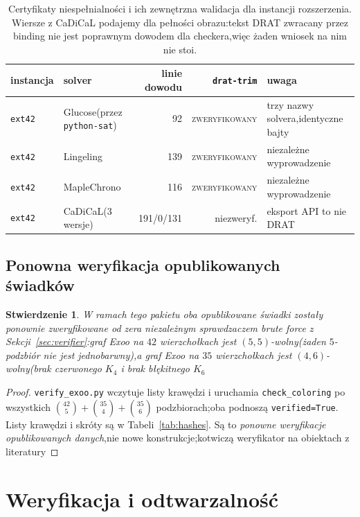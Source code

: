 \documentclass[11pt]{article}
\newtheorem{proposition}[theorem]{Stwierdzenie}
\theoremstyle{definition}
\theoremstyle{plain}
\newcommand{\K}{\ensuremath{K}}
\begin{document}
\begin{table}[ht]\centering\small
\begin{tabular}{llrrl}
\toprule
instancja & solver & linie dowodu & \texttt{drat-trim} & uwaga \\
\midrule
\texttt{ext42} & Glucose(przez \texttt{python-sat})& 92 &\textsc{zweryfikowany}& trzy nazwy solvera,identyczne bajty \\
\texttt{ext42} & Lingeling& 139 &\textsc{zweryfikowany}& niezależne wyprowadzenie \\
\texttt{ext42} & MapleChrono& 116 &\textsc{zweryfikowany}& niezależne wyprowadzenie \\
\texttt{ext42} & CaDiCaL(3 wersje)& 191/0/131 & niezweryf.& eksport API to nie DRAT \\
\bottomrule
\end{tabular}
\caption{Certyfikaty niespełnialności i ich zewnętrzna walidacja dla instancji rozszerzenia. Wiersze z CaDiCaL podajemy dla pełności obrazu:tekst DRAT zwracany przez binding nie jest poprawnym dowodem dla checkera,więc żaden wniosek na nim nie stoi.}\label{tab:proofs}
\end{table}

\subsection{Ponowna weryfikacja opublikowanych świadków}\label{sec:reswitnesses}

\begin{proposition}\label{prop:witnesses}
W ramach tego pakietu oba opublikowane świadki zostały ponownie zweryfikowane od zera niezależnym sprawdzaczem brute force z Sekcji~\ref{sec:verifier}:graf Exoo na $42$ wierzchołkach jest $(5,5)$-wolny(żaden $5$-podzbiór nie jest jednobarwny),a graf Exoo na $35$ wierzchołkach jest $(4,6)$-wolny(brak czerwonego $\K_4$ i brak błękitnego $\K_6$\end{proposition}

\begin{proof}
\texttt{verify\_exoo.py} wczytuje listy krawędzi i uruchamia \texttt{check\_coloring} po wszystkich $\binom{42}{5}+\binom{35}{4}+\binom{35}{6}$ podzbiorach;oba podnoszą \texttt{verified=True}. Listy krawędzi i skróty są w Tabeli~\ref{tab:hashes}. Są to \emph{ponowne weryfikacje opublikowanych danych},nie nowe konstrukcje;kotwiczą weryfikator na obiektach z literatury\end{proof}

\section{Weryfikacja i odtwarzalność}\label{sec:repro}
\end{document}
